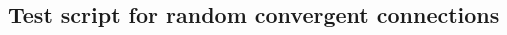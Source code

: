 

\newlength{\oldtopmargin}
\newlength{\oldoddsidemargin}
\newlength{\oldevensidemargin}
\newlength{\oldtextwidth}
\newlength{\oldtextheight}
\newlength{\oldmarginparwidth}
\newlength{\oldfootskip}
\newlength{\oldheadwidth}
\newlength{\oldvoffset}
\newlength{\oldhoffset}

\setlength{\oldtopmargin}{\topmargin}
\setlength{\oldoddsidemargin}{\oddsidemargin}
\setlength{\oldevensidemargin}{\evensidemargin}
\setlength{\oldtextwidth}{\textwidth}
\setlength{\oldtextheight}{\textheight}
\setlength{\oldmarginparwidth}{\marginparwidth}
\setlength{\oldfootskip}{\footskip}
\setlength{\oldheadwidth}{\headwidth}
\setlength{\oldvoffset}{\voffset}
\setlength{\oldhoffset}{\hoffset}

\setlength{\topmargin}{1mm}
\setlength{\oddsidemargin}{5mm}
\setlength{\evensidemargin}{5mm}
\setlength{\textwidth}{175mm}
\setlength{\textheight}{250mm}
\setlength{\marginparwidth}{15mm}
\setlength{\footskip}{10mm}
\setlength{\headwidth}{\textwidth}
\setlength{\voffset}{-10mm}
\setlength{\hoffset}{-15mm}



\begin{landscape}
\titlespacing*{\chapter}{0pt}{-30pt}{7pt}
\titleformat{\chapter}[display]{\normalfont\huge\bfseries}{\chaptertitlename\ \thechapter}{4pt}{\Huge}\chapter{Test script for random convergent connections\label{app:rcc}}
\setlength{\columnsep}{0.9cm}
\begin{multicols*}{2}

\end{multicols*}
\end{landscape}
\clearchapter



